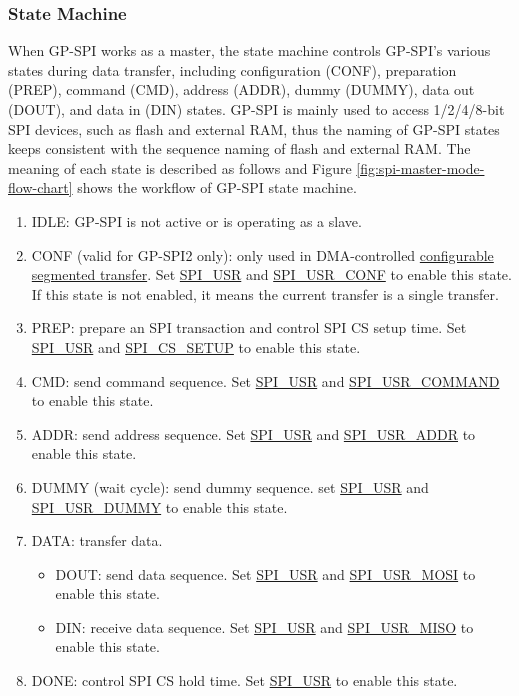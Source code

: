\documentclass[main\_\_EN.tex]{subfiles}
\begin{document}
\subsubsection{State Machine}
\label{sec:gp-spi2-state-machine}

When GP-SPI works as a master, the state machine controls GP-SPI's various states during data transfer, including configuration (CONF), preparation (PREP), command (CMD), address (ADDR), dummy (DUMMY), data out (DOUT), and data in (DIN) states. GP-SPI is mainly used to access 1/2/4/8-bit SPI devices, such as flash and external RAM, thus the naming of GP-SPI states keeps consistent with the sequence naming of flash and external RAM. The meaning of each state is described as follows and Figure \ref{fig:spi-master-mode-flow-chart} shows the workflow of GP-SPI state machine.

\begin{enumerate}
    \item IDLE: GP-SPI is not active or is operating as a slave.
    \item CONF (valid for GP-SPI2 only): only used in DMA-controlled \hyperref[sec:gp-spi-dma-seg-conf-trans]{configurable segmented transfer}. Set \hyperref[fielddesc:SPIUSR]{SPI\_USR} and \hyperref[fielddesc:SPIUSRCONF]{SPI\_USR\_CONF} to enable this state. If this state is not enabled, it means the current transfer is a single transfer.
    \item PREP: prepare an SPI transaction and control SPI CS setup time. Set \hyperref[fielddesc:SPIUSR]{SPI\_USR} and \hyperref[fielddesc:SPICSSETUP]{SPI\_CS\_SETUP} to enable this state.
    \item\label{phase:cmd} CMD: send command sequence. Set \hyperref[fielddesc:SPIUSR]{SPI\_USR} and \hyperref[fielddesc:SPIUSRCOMMAND]{SPI\_USR\_COMMAND} to enable this state.
    \item\label{phase:addr} ADDR: send address sequence. Set \hyperref[fielddesc:SPIUSR]{SPI\_USR} and \hyperref[fielddesc:SPIUSRADDR]{SPI\_USR\_ADDR} to enable this state.
    \item DUMMY (wait cycle): send dummy sequence. set \hyperref[fielddesc:SPIUSR]{SPI\_USR} and \hyperref[fielddesc:SPIUSRDUMMY]{SPI\_USR\_DUMMY} to enable this state.
    \item\label{phase:data} DATA: transfer data.
    \begin{itemize}
    \item DOUT: send data sequence. Set \hyperref[fielddesc:SPIUSR]{SPI\_USR} and \hyperref[fielddesc:SPIUSRMOSI]{SPI\_USR\_MOSI} to enable this state.
    \item DIN: receive data sequence. Set \hyperref[fielddesc:SPIUSR]{SPI\_USR} and \hyperref[fielddesc:SPIUSRMISO]{SPI\_USR\_MISO} to enable this state.
    \end{itemize}
    \item DONE: control SPI CS hold time. Set \hyperref[fielddesc:SPIUSR]{SPI\_USR} to enable this state.
\end{enumerate}
\end{document}
